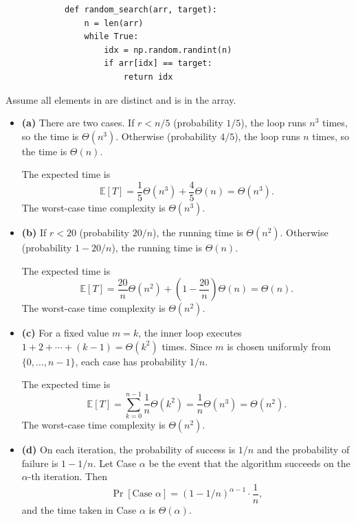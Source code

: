 \begin{prob}
\begin{subprobset}
    \begin{subprob}
        \begin{verbatim}
            def random_search(arr, target):
                n = len(arr)
                while True:
                    idx = np.random.randint(n)
                    if arr[idx] == target:
                        return idx
        \end{verbatim}
        Assume all elements in  are distinct and  is in the array.
    \end{subprob}
    
    \end{subprobset}
    
    \begin{soln}
    \begin{itemize}
        \item \textbf{(a)}  
        There are two cases.  
        If $r < n/5$ (probability $1/5$), the loop runs $n^3$ times, so the time is
        $\Theta(n^3)$.  
        Otherwise (probability $4/5$), the loop runs $n$ times, so the time is
        $\Theta(n)$.  
    
        The expected time is
        \[
        \mathbb{E}[T] = \frac{1}{5}\Theta(n^3) + \frac{4}{5}\Theta(n) = \Theta(n^3).
        \]
        The worst-case time complexity is $\Theta(n^3)$.
    
        \item \textbf{(b)}  
        If $r < 20$ (probability $20/n$), the running time is $\Theta(n^2)$.  
        Otherwise (probability $1 - 20/n$), the running time is $\Theta(n)$.  
    
        The expected time is
        \[
        \mathbb{E}[T]
        = \frac{20}{n}\Theta(n^2) + \left(1-\frac{20}{n}\right)\Theta(n)
        = \Theta(n).
        \]
        The worst-case time complexity is $\Theta(n^2)$.
    
        \item \textbf{(c)}  
        For a fixed value $m = k$, the inner loop executes
        $1 + 2 + \cdots + (k-1) = \Theta(k^2)$ times.
        Since $m$ is chosen uniformly from $\{0,\ldots,n-1\}$, each case has
        probability $1/n$.
    
        The expected time is
        \[
        \mathbb{E}[T]
        = \sum_{k=0}^{n-1} \frac{1}{n}\Theta(k^2)
        = \frac{1}{n}\Theta(n^3)
        = \Theta(n^2).
        \]
        The worst-case time complexity is $\Theta(n^2)$.
    
        \item \textbf{(d)}  
        On each iteration, the probability of success is $1/n$ and the probability
        of failure is $1 - 1/n$.
        Let Case $\alpha$ be the event that the algorithm succeeds on the
        $\alpha$-th iteration.
        Then
        \[
        \Pr[\text{Case }\alpha] = (1 - 1/n)^{\alpha-1}\cdot \frac{1}{n},
        \]
        and the time taken in Case $\alpha$ is $\Theta(\alpha)$.
    

\end{itemize}
\end{soln}
\end{prob}
